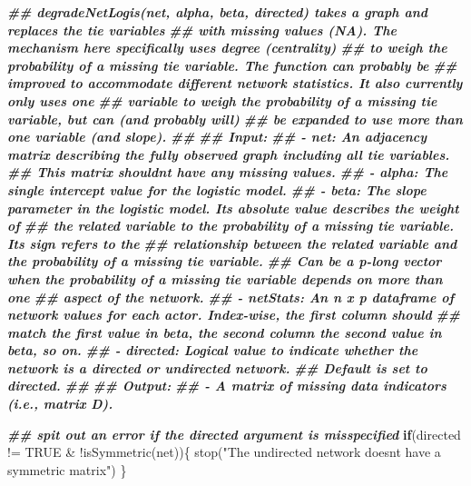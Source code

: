 \documentclass[
]{article}
\newenvironment{Shaded}{\begin{snugshade}}{\end{snugshade}}
\newcommand{\ConstantTok}[1]{\textcolor[rgb]{0.00,0.00,0.00}{#1}}
\newcommand{\ControlFlowTok}[1]{\textcolor[rgb]{0.13,0.29,0.53}{\textbf{#1}}}
\newcommand{\DocumentationTok}[1]{\textcolor[rgb]{0.56,0.35,0.01}{\textbf{\textit{#1}}}}
\newcommand{\FunctionTok}[1]{\textcolor[rgb]{0.00,0.00,0.00}{#1}}
\newcommand{\NormalTok}[1]{#1}
\newcommand{\SpecialCharTok}[1]{\textcolor[rgb]{0.00,0.00,0.00}{#1}}
\newcommand{\StringTok}[1]{\textcolor[rgb]{0.31,0.60,0.02}{#1}}
\begin{document}
\begin{Shaded}
\begin{Highlighting}[]
  \DocumentationTok{\#\# degradeNetLogis(net, alpha, beta, directed) takes a graph and replaces the tie variables}
  \DocumentationTok{\#\# with missing values (NA). The mechanism here specifically uses degree (centrality) }
  \DocumentationTok{\#\# to weigh the probability of a missing tie variable. The function can probably be}
  \DocumentationTok{\#\# improved to accommodate different network statistics. It also currently only uses one}
  \DocumentationTok{\#\# variable to weigh the probability of a missing tie variable, but can (and probably will)}
  \DocumentationTok{\#\# be expanded to use more than one variable (and slope).}
  \DocumentationTok{\#\#}
  \DocumentationTok{\#\# Input:}
  \DocumentationTok{\#\# {-} net:      An adjacency matrix describing the fully observed graph including all tie variables.}
  \DocumentationTok{\#\#             This matrix shouldn\textquotesingle{}t have any missing values.}
  \DocumentationTok{\#\# {-} alpha:    The single intercept value for the logistic model.}
  \DocumentationTok{\#\# {-} beta:     The slope parameter in the logistic model. Its absolute value describes the weight of }
  \DocumentationTok{\#\#             the related variable to the probability of a missing tie variable. Its sign refers to the}
  \DocumentationTok{\#\#             relationship between the related variable and the probability of a missing tie variable.}
  \DocumentationTok{\#\#             Can be a p{-}long vector when the probability of a missing tie variable depends on more than one }
  \DocumentationTok{\#\#             aspect of the network.}
  \DocumentationTok{\#\# {-} netStats: An n x p dataframe of network values for each actor. Index{-}wise, the first column should }
  \DocumentationTok{\#\#             match the first value in \textquotesingle{}beta\textquotesingle{}, the second column the second value in beta, so on.}
  \DocumentationTok{\#\# {-} directed: Logical value to indicate whether the network is a directed or undirected network.}
  \DocumentationTok{\#\#             Default is set to directed.}
  \DocumentationTok{\#\#}
  \DocumentationTok{\#\# Output:}
  \DocumentationTok{\#\# {-} A matrix of missing data indicators (i.e., matrix \textquotesingle{}D\textquotesingle{}).}
  
  \DocumentationTok{\#\# spit out an error if the directed argument is misspecified}
  \ControlFlowTok{if}\NormalTok{(directed }\SpecialCharTok{!=} \ConstantTok{TRUE} \SpecialCharTok{\&} \SpecialCharTok{!}\FunctionTok{isSymmetric}\NormalTok{(net))\{}
    \FunctionTok{stop}\NormalTok{(}\StringTok{"The undirected network doesn\textquotesingle{}t have a symmetric matrix"}\NormalTok{)}
\NormalTok{  \}}
  

\end{Highlighting}
\end{Shaded}
\end{document}
